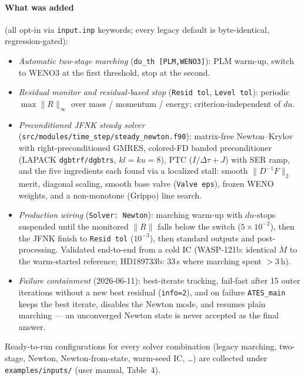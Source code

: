 \documentclass[english,a4paper]{kiseon_memo}
\begin{document}
\paragraph{What was added} (all opt-in via \texttt{input.inp} keywords;
every legacy default is byte-identical, regression-gated):
\begin{itemize}
\item \emph{Automatic two-stage marching} (\texttt{du\_th [PLM,WENO3]}):
  PLM warm-up, switch to WENO3 at the first threshold, stop at the second.
\item \emph{Residual monitor and residual-based stop} (\texttt{Resid
  tol}, \texttt{Level tol}): periodic $\max\|R\|_\infty$ over mass /
  momentum / energy; criterion-independent of $du$.
\item \emph{Preconditioned JFNK steady solver}
  (\texttt{src/modules/time\_step/steady\_newton.f90}): matrix-free
  Newton--Krylov with right-preconditioned GMRES, colored-FD banded
  preconditioner (LAPACK \texttt{dgbtrf/dgbtrs}, $kl{=}ku{=}8$), PTC
  ($I/\Delta\tau + J$) with SER ramp, and the five ingredients each found
  via a localized stall: smooth $\|D^{-1}F\|_2$ merit, diagonal scaling,
  smooth base valve (\texttt{Valve eps}), frozen WENO weights, and a
  non-monotone (Grippo) line search.
\item \emph{Production wiring} (\texttt{Solver: Newton}): marching
  warm-up with $du$-stops suspended until the monitored $\|R\|$ falls
  below the switch ($5\times10^{-2}$), then the JFNK finish to
  \texttt{Resid tol} ($10^{-3}$), then standard outputs and
  post-processing. Validated end-to-end from a cold IC (WASP-121b:
  identical $\dot M$ to the warm-started reference; HD189733b: 33\,s
  where marching spent $>$3\,h).
\item \emph{Failure containment} (2026-06-11): best-iterate tracking,
  fail-fast after 15 outer iterations without a new best residual
  (\texttt{info=2}), and on failure \texttt{ATES\_main} keeps the best
  iterate, disables the Newton mode, and resumes plain marching --- an
  unconverged Newton state is never accepted as the final answer.
\end{itemize}

Ready-to-run configurations for every solver combination (legacy
marching, two-stage, Newton, Newton-from-state, warm-seed IC, \ldots) are
collected under \texttt{examples/inputs/} (user manual, Table~4).
\end{document}

